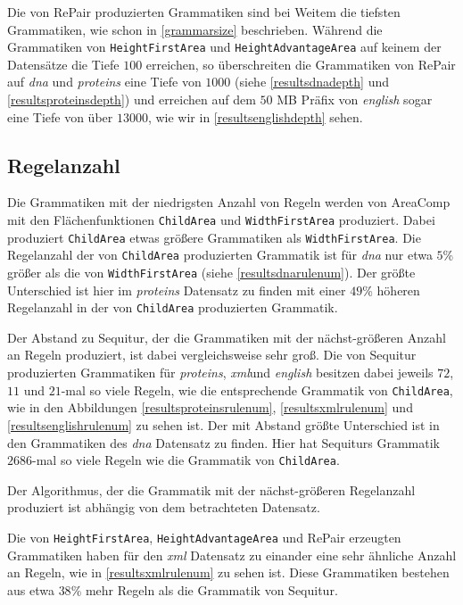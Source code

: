 Die von RePair produzierten Grammatiken sind bei Weitem die tiefsten Grammatiken, wie schon in \autoref{grammarsize} beschrieben. Während die Grammatiken von \texttt{HeightFirstArea} und \texttt{HeightAdvantageArea} auf keinem der Datensätze die Tiefe $100$ erreichen, so überschreiten die Grammatiken von RePair auf \emph{dna} und \emph{proteins} eine Tiefe von $1000$ (siehe \autoref{resultsdnadepth} und \autoref{resultsproteinsdepth}) und erreichen auf dem $50$ MB Präfix von \emph{english} sogar eine Tiefe von über $13000$, wie wir in \autoref{resultsenglishdepth} sehen.

\subsection{Regelanzahl}

Die Grammatiken mit der niedrigsten Anzahl von Regeln werden von AreaComp mit den Flächenfunktionen \texttt{ChildArea} und \texttt{WidthFirstArea} produziert. Dabei produziert \texttt{ChildArea} etwas größere Grammatiken als \texttt{WidthFirstArea}. Die Regelanzahl der von \texttt{ChildArea} produzierten Grammatik ist für \emph{dna} nur etwa $5$\% größer als die von \texttt{WidthFirstArea} (siehe \autoref{resultsdnarulenum}). 
Der größte Unterschied ist hier im \emph{proteins} Datensatz zu finden mit einer $49$\% höheren Regelanzahl in der von \texttt{ChildArea} produzierten Grammatik. 

Der Abstand zu Sequitur, der die Grammatiken mit der nächst-größeren Anzahl an Regeln produziert, ist dabei vergleichsweise sehr groß. Die von Sequitur produzierten Grammatiken für \emph{proteins}, \emph{xml}und \emph{english} besitzen dabei jeweils $72$, $11$ und $21$-mal so viele Regeln, wie die entsprechende Grammatik von \texttt{ChildArea}, wie in den Abbildungen \autoref{resultsproteinsrulenum}, \autoref{resultsxmlrulenum} und \autoref{resultsenglishrulenum} zu sehen ist.
Der mit Abstand größte Unterschied ist in den Grammatiken des \emph{dna} Datensatz zu finden. Hier hat Sequiturs Grammatik $2686$-mal so viele Regeln wie die Grammatik von \texttt{ChildArea}. 

Der Algorithmus, der die Grammatik mit der nächst-größeren Regelanzahl produziert ist abhängig von dem betrachteten Datensatz. 

Die von \texttt{HeightFirstArea}, \texttt{HeightAdvantageArea} und RePair erzeugten Grammatiken haben für den \emph{xml} Datensatz zu einander eine sehr ähnliche Anzahl an Regeln, wie in \autoref{resultsxmlrulenum} zu sehen ist. Diese Grammatiken bestehen aus etwa $38$\% mehr Regeln als die Grammatik von Sequitur.

